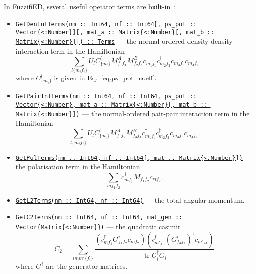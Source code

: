 \documentclass{timesjhep}
\begin{document}
In FuzzifiED, several useful operator terms are built-in~:
\begin{itemize}
    \item \href{https://docs.fuzzified.world/models/\#FuzzifiED.GetDenIntTerms}{\lstinline|GetDenIntTerms(nm :: Int64, nf :: Int64[, ps_pot :: Vector{<:Number}][, mat_a :: Matrix{<:Number}[, mat_b :: Matrix{<:Number}]]) :: Terms|} --- the normal-ordered density-density interaction term in the Hamiltonian 
    \begin{equation}
        \sum_{l\{m_if_i\}}U_lC^l_{\{m_i\}}M^A_{f_1f_4}M^B_{f_2f_3}c^\dagger_{m_1f_1}c^\dagger_{m_2f_2}c_{m_3f_3}c_{m_4f_4}
    \end{equation}
    where $C^l_{\{m_i\}}$ is given in Eq.~\eqref{eq:ps_pot_coeff}.
    \item \href{https://docs.fuzzified.world/models/\#FuzzifiED.GetPairIntTerms}{\lstinline|GetPairIntTerms(nm :: Int64, nf :: Int64, ps_pot :: Vector{<:Number}, mat_a :: Matrix{<:Number}[, mat_b :: Matrix{<:Number}])|} --- the normal-ordered pair-pair interaction term in the Hamiltonian 
    \begin{equation}
        \sum_{l\{m_if_i\}}U_lC^l_{\{m_i\}}M^A_{f_1f_2}M^B_{f_3f_4}c^\dagger_{m_1f_1}c^\dagger_{m_2f_2}c_{m_3f_3}c_{m_4f_4}.
    \end{equation}
    \item \href{https://docs.fuzzified.world/models/\#FuzzifiED.GetPolTerms-Tuple{Int64,\%20Int64,\%20Matrix{\%3C:Number}}}{\lstinline|GetPolTerms(nm :: Int64, nf :: Int64[, mat :: Matrix{<:Number}])|} --- the polarisation term in the Hamiltonian 
    \begin{equation}
        \sum_{mf_1f_2}c^\dagger_{mf_1}M_{f_1f_2}c_{mf_2}.
    \end{equation}
    \item \href{https://docs.fuzzified.world/models/\#FuzzifiED.GetL2Terms-Tuple{Int64,\%20Int64}}{\lstinline|GetL2Terms(nm :: Int64, nf :: Int64)|} --- the total angular momentum. 
    \item \href{https://docs.fuzzified.world/models/\#FuzzifiED.GetC2Terms-Tuple{Int64,\%20Int64,\%20Vector{\%3C:AbstractMatrix{\%3C:Number}}}}{\lstinline|GetC2Terms(nm :: Int64, nf :: Int64, mat_gen :: Vector{Matrix{<:Number}})|} --- the quadratic casimir 
    \begin{equation}
        C_2=\sum_{imm'\{f_i\}}\frac{(c^\dagger_{mf_1}G^i_{f_1f_2}c_{mf_2})(c^\dagger_{m'f_3}(G^i_{f_3f_4})^\dagger c_{m'f_4})}{\operatorname{tr}G_i^\dagger G_i}
    \end{equation}
    where $G^i$ are the generator matrices.
\end{itemize}
\end{document}
